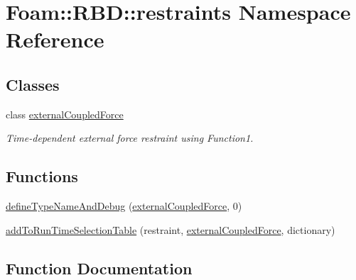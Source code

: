 \hypertarget{namespaceFoam_1_1RBD_1_1restraints}{}\section{Foam\+:\+:R\+BD\+:\+:restraints Namespace Reference}
\label{namespaceFoam_1_1RBD_1_1restraints}
\subsection*{Classes}
\begin{DoxyCompactItemize}
\item 
class \hyperlink{classFoam_1_1RBD_1_1restraints_1_1externalCoupledForce}{external\+Coupled\+Force}
\begin{DoxyCompactList}\small\item\em Time-\/dependent external force restraint using Function1. \end{DoxyCompactList}\end{DoxyCompactItemize}
\subsection*{Functions}
\begin{DoxyCompactItemize}
\item 
\hyperlink{namespaceFoam_1_1RBD_1_1restraints_a3cc85b8ccbad2fb0fcb2119f4e9f8b3d}{define\+Type\+Name\+And\+Debug} (\hyperlink{classFoam_1_1RBD_1_1restraints_1_1externalCoupledForce}{external\+Coupled\+Force}, 0)
\item 
\hyperlink{namespaceFoam_1_1RBD_1_1restraints_a8655ec7fb8c93a023f4b198eed0d3238}{add\+To\+Run\+Time\+Selection\+Table} (restraint, \hyperlink{classFoam_1_1RBD_1_1restraints_1_1externalCoupledForce}{external\+Coupled\+Force}, dictionary)
\end{DoxyCompactItemize}


\subsection{Function Documentation}
\mbox{\label{namespaceFoam_1_1RBD_1_1restraints_a3cc85b8ccbad2fb0fcb2119f4e9f8b3d}} 

